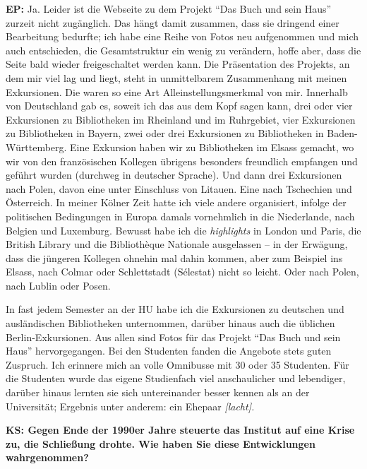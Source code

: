 \documentclass[a4paper,
fontsize=11pt,
oneside,
numbers=noperiodatend,
parskip=half-,
bibliography=totoc,
final
]{scrartcl}
\begin{document}
\textbf{EP:} Ja. Leider ist die Webseite zu dem Projekt \enquote{Das
Buch und sein Haus} zurzeit nicht zugänglich. Das hängt damit zusammen,
dass sie dringend einer Bearbeitung bedurfte; ich habe eine Reihe von
Fotos neu aufgenommen und mich auch entschieden, die Gesamtstruktur ein
wenig zu verändern, hoffe aber, dass die Seite bald wieder
freigeschaltet werden kann. Die Präsentation des Projekts, an dem mir
viel lag und liegt, steht in unmittelbarem Zusammenhang mit meinen
Exkursionen. Die waren so eine Art Alleinstellungsmerkmal von mir.
Innerhalb von Deutschland gab es, soweit ich das aus dem Kopf sagen
kann, drei oder vier Exkursionen zu Bibliotheken im Rheinland und im
Ruhrgebiet, vier Exkursionen zu Bibliotheken in Bayern, zwei oder drei
Exkursionen zu Bibliotheken in Baden-Württemberg. Eine Exkursion haben
wir zu Bibliotheken im Elsass gemacht, wo wir von den französischen
Kollegen übrigens besonders freundlich empfangen und geführt wurden
(durchweg in deutscher Sprache). Und dann drei Exkursionen nach Polen,
davon eine unter Einschluss von Litauen. Eine nach Tschechien und
Österreich. In meiner Kölner Zeit hatte ich viele andere organisiert,
infolge der politischen Bedingungen in Europa damals vornehmlich in die
Niederlande, nach Belgien und Luxemburg. Bewusst habe ich die
\emph{highlights} in London und Paris, die British Library und die
Bibliothèque Nationale ausgelassen -- in der Erwägung, dass die jüngeren
Kollegen ohnehin mal dahin kommen, aber zum Beispiel ins Elsass, nach
Colmar oder Schlettstadt (Sélestat) nicht so leicht. Oder nach Polen,
nach Lublin oder Posen.

In fast jedem Semester an der HU habe ich die Exkursionen zu deutschen
und ausländischen Bibliotheken unternommen, darüber hinaus auch die
üblichen Berlin-Exkursionen. Aus allen sind Fotos für das Projekt
\enquote{Das Buch und sein Haus} hervorgegangen. Bei den Studenten
fanden die Angebote stets guten Zuspruch. Ich erinnere mich an volle
Omnibusse mit 30 oder 35 Studenten. Für die Studenten wurde das eigene
Studienfach viel anschaulicher und lebendiger, darüber hinaus lernten
sie sich untereinander besser kennen als an der Universität; Ergebnis
unter anderem: ein Ehepaar \emph{{[}lacht{]}.}

\textbf{KS: Gegen Ende der 1990er Jahre steuerte das Institut auf eine
Krise zu, die Schließung drohte. Wie haben Sie diese Entwicklungen
wahrgenommen?}
\end{document}
